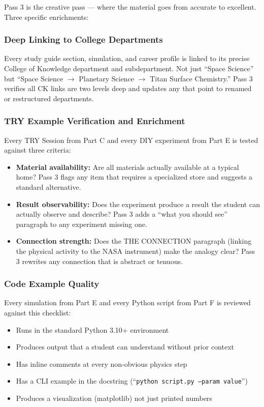 \documentclass[11pt,letterpaper]{article}
\begin{document}
Pass 3 is the creative pass --- where the material goes from accurate to excellent. Three specific enrichments:

\subsubsection{Deep Linking to College Departments}

Every study guide section, simulation, and career profile is linked to its precise College of Knowledge department and subdepartment. Not just ``Space Science'' but ``Space Science $\to$ Planetary Science $\to$ Titan Surface Chemistry.'' Pass 3 verifies all CK links are two levels deep and updates any that point to renamed or restructured departments.

\subsubsection{TRY Example Verification and Enrichment}

Every TRY Session from Part C and every DIY experiment from Part E is tested against three criteria:
\begin{itemize}[leftmargin=*, itemsep=2pt]
  \item \textbf{Material availability:} Are all materials actually available at a typical home? Pass 3 flags any item that requires a specialized store and suggests a standard alternative.
  \item \textbf{Result observability:} Does the experiment produce a result the student can actually observe and describe? Pass 3 adds a ``what you should see'' paragraph to any experiment missing one.
  \item \textbf{Connection strength:} Does the THE CONNECTION paragraph (linking the physical activity to the NASA instrument) make the analogy clear? Pass 3 rewrites any connection that is abstract or tenuous.
\end{itemize}

\subsubsection{Code Example Quality}

Every simulation from Part E and every Python script from Part F is reviewed against this checklist:
\begin{itemize}[leftmargin=*, itemsep=2pt]
  \item Runs in the standard Python 3.10+ environment
  \item Produces output that a student can understand without prior context
  \item Has inline comments at every non-obvious physics step
  \item Has a CLI example in the docstring (``\texttt{python script.py --param value}'')
  \item Produces a visualization (matplotlib) not just printed numbers
\end{itemize}
\end{document}
